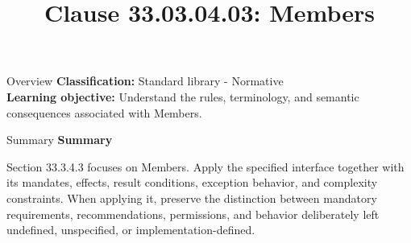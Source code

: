 \documentclass[10pt,letterpaper]{article}
\title{Clause 33.03.04.03: Members}
\author{}
\date{}
\begin{document}
\maketitle
\begin{CornellOverviewBox}{Overview}
\textbf{Classification:} Standard library - Normative\\[2pt]
\textbf{Learning objective:} Understand the rules, terminology, and semantic consequences associated with Members.
\end{CornellOverviewBox}\begin{CornellSummaryBox}{Summary}
{\sffamily\bfseries\color{Accent} Summary}\par\vspace{3pt}Section 33.3.4.3 focuses on Members. Apply the specified interface together with its mandates, effects, result conditions, exception behavior, and complexity constraints. When applying it, preserve the distinction between mandatory requirements, recommendations, permissions, and behavior deliberately left undefined, unspecified, or implementation-defined.
\end{CornellSummaryBox}
\end{document}
